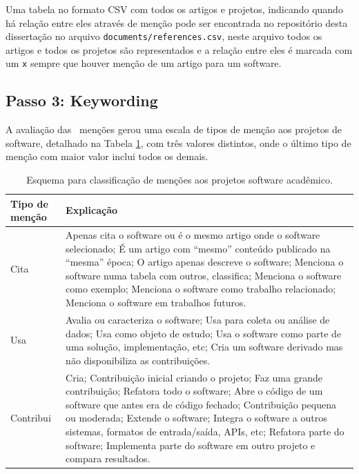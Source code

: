 Uma tabela no formato CSV com todos os artigos e projetos, indicando quando há
relação entre eles através de menção pode ser encontrada no repositório desta
dissertação no arquivo \texttt{documents/references.csv}, neste arquivo todos
os artigos e todos os projetos são representados e a relação entre eles é
marcada com um \texttt{x} sempre que houver menção de um artigo para um
software.



\subsection{Passo 3: Keywording}

A avaliação das \ScreeningCount \ menções gerou uma escala de tipos de menção
aos projetos de software, detalhado na Tabela \ref{esquema-de-mencao}, com três valores
distintos, onde o último tipo de menção com maior valor inclui todos os demais.

\begin{table}[h]
\caption{Esquema para classificação de menções aos projetos software acadêmico.}
\centering
\begin{tabular}{ l p{10cm} }
  \hline
  Tipo de menção           & Explicação \\
  \hline
  Cita      & Apenas cita o software ou é o mesmo artigo onde o software selecionado; É um artigo com ``mesmo'' conteúdo publicado na ``mesma'' época; O artigo apenas descreve o software; Menciona o software numa tabela com outros, classifica; Menciona o software como exemplo; Menciona o software como trabalho relacionado; Menciona o software em trabalhos futuros. \\
  Usa       & Avalia ou caracteriza o software; Usa para coleta ou análise de dados; Usa como objeto de estudo; Usa o software como parte de uma solução, implementação, etc; Cria um software derivado mas não disponibiliza as contribuições. \\
  Contribui & Cria; Contribuição inicial criando o projeto; Faz uma grande contribuição; Refatora todo o software; Abre o código de um software que antes era de código fechado; Contribuição pequena ou moderada; Extende o software; Integra o software a outros sistemas, formatos de entrada/saída, APIs, etc; Refatora parte do software; Implementa parte do software em outro projeto e compara resultados. \\
  \hline
\end{tabular}
\label{esquema-de-mencao}
\end{table}

